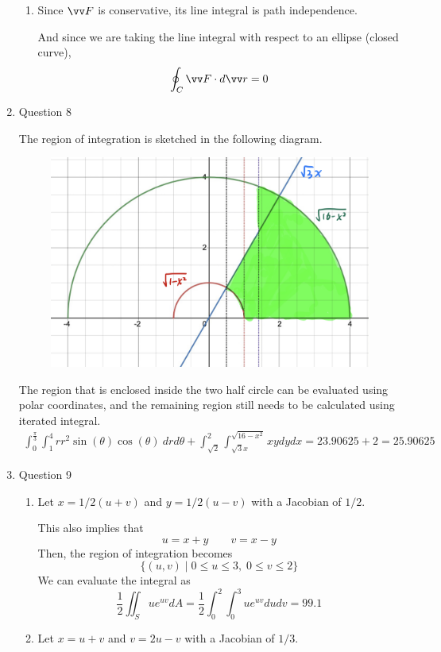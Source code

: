 \documentclass[11pt]{article}
\begin{document}
\begin{enumerate}
\begin{enumerate}
        \item Since $\vv F$ is conservative, its line integral is path independence.
        
        And since we are taking the line integral with respect to an ellipse (closed curve),
        $$
        \oint_C \vv F \cdot d\vv r = 0
        $$
    \end{enumerate}
    
    \item Question 8
    
    The region of integration is sketched in the following diagram.
    \begin{figure}[h]
        \centering
        \includegraphics[width=0.45\linewidth]{figures/test223.PNG}
    \end{figure}
    The region that is enclosed inside the two half circle can be evaluated using polar coordinates, and the remaining region still needs to be calculated using iterated integral.
    $$
    \begin{aligned}
    \int_{0}^{\frac{\pi}{3}}\int_{1}^{4}rr^{2}\sin\left(\theta\right)\cos\left(\theta\right)\ drd\theta + \int_{\sqrt{2}}^{2}\int_{\sqrt{3}x}^{\sqrt{16-x^{2}}}xydydx = 23.90625 + 2 = 25.90625
    \end{aligned}
    $$
    
    \item Question 9
    \begin{enumerate}
        \item Let $x=1/2(u+v)$ and $y=1/2(u-v)$ with a Jacobian of $1/2$.
        
        This also implies that
        $$
        u = x+y \qquad v = x-y
        $$
        Then, the region of integration becomes
        $$
        \{ (u,v) \mid 0 \leq u \leq 3,\; 0 \leq v \leq 2 \}
        $$
        We can evaluate the integral as
        $$
        \frac{1}{2} \iint_S ue^{uv} dA = \frac{1}{2}\int_0^2 \int_0^3 ue^{uv} dudv = 99.1
        $$
        
        \item Let $x=u+v$ and $v=2u-v$ with a Jacobian of $1/3$.
        

\end{enumerate}
\end{enumerate}
\end{document}
